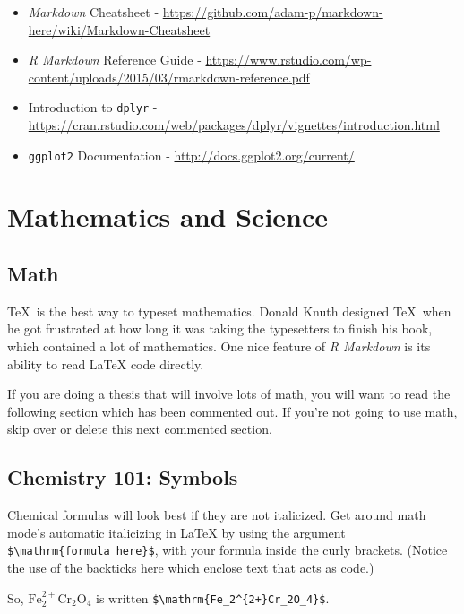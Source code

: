 \documentclass[12pt,twoside]{reedthesis}
\begin{document}
  \begin{itemize}
  \item
    \emph{Markdown} Cheatsheet -
    \url{https://github.com/adam-p/markdown-here/wiki/Markdown-Cheatsheet}
  \item
    \emph{R Markdown} Reference Guide -
    \url{https://www.rstudio.com/wp-content/uploads/2015/03/rmarkdown-reference.pdf}
  \item
    Introduction to \texttt{dplyr} -
    \url{https://cran.rstudio.com/web/packages/dplyr/vignettes/introduction.html}
  \item
    \texttt{ggplot2} Documentation -
    \url{http://docs.ggplot2.org/current/}
  \end{itemize}
  
  \hypertarget{math-sci}{\chapter{Mathematics and
  Science}\label{math-sci}}
  
  \hypertarget{math}{\section{Math}\label{math}}
  
  \TeX~is the best way to typeset mathematics. Donald Knuth designed
  \TeX~when he got frustrated at how long it was taking the typesetters to
  finish his book, which contained a lot of mathematics. One nice feature
  of \emph{R Markdown} is its ability to read LaTeX code directly.
  
  If you are doing a thesis that will involve lots of math, you will want
  to read the following section which has been commented out. If you're
  not going to use math, skip over or delete this next commented section.
  
  \section{Chemistry 101: Symbols}\label{chemistry-101-symbols}
  
  Chemical formulas will look best if they are not italicized. Get around
  math mode's automatic italicizing in LaTeX by using the argument
  \texttt{\$\textbackslash{}mathrm\{formula\ here\}\$}, with your formula
  inside the curly brackets. (Notice the use of the backticks here which
  enclose text that acts as code.)
  
  So, \(\mathrm{Fe_2^{2+}Cr_2O_4}\) is written
  \texttt{\$\textbackslash{}mathrm\{Fe\_2\^{}\{2+\}Cr\_2O\_4\}\$}.
  
\end{document}
